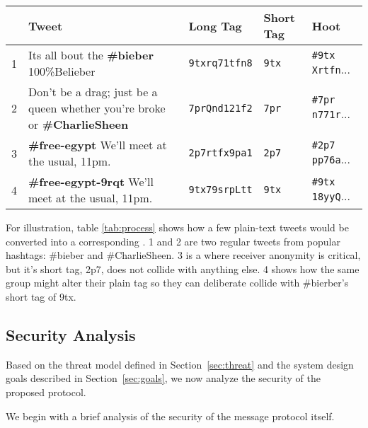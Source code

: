 \begin{table*}
\caption{This table shows how an individual tweet would become a \hoot by noting the Long Tag, Short Tag, and the final \hoot. Tweet 4 shows how a rebellion group could collide with \#bieber and disguise it's messages.
\label{tab:process}
}
\begin{center}
    \begin{tabular}{ l  l  l  l  l }
	 & Tweet & Long Tag & Short Tag & Hoot \\ \hline
	1 & Its all bout the {\bf \#bieber} 100\%Belieber                                 & {\tt 9txrq71tfn8} &  {\tt 9tx} & {\tt \#9tx Xrtfn}... \\
	2 & Don't be a drag; just be a queen whether you're broke or {\bf \#CharlieSheen} & {\tt 7prQnd121f2} & {\tt 7pr} & {\tt \#7pr n771r}... \\
	3 & {\bf \#free-egypt} We'll meet at the usual, 11pm.                             & {\tt 2p7rtfx9pa1} & {\tt 2p7} & {\tt \#2p7 pp76a}... \\
	4 & {\bf \#free-egypt-9rqt} We'll meet at the usual, 11pm.                        & {\tt 9tx79srpLtt} &  {\tt 9tx}  & {\tt \#9tx 18yyQ}... \\
    \end{tabular}
\end{center}
\end{table*}

For illustration, table \ref{tab:process} shows how a few plain-text tweets would be converted into a corresponding \hoot. 1 and 2 are two regular tweets from popular hashtags: \#bieber and \#CharlieSheen. 3 is a \hoot where receiver anonymity is critical, but it's short tag, 2p7, does not collide with anything else. 4 shows how the same group might alter their plain tag so they can deliberate collide with \#bierber's short tag of 9tx.


\subsection{Security Analysis}
\label{sec:security}

Based on the threat model defined in Section~\ref{sec:threat} and the
system design goals described in Section~\ref{sec:goals}, we now analyze
the security of the proposed \hoot protocol.

%
We begin with a brief analysis of the security of the message protocol
itself.

